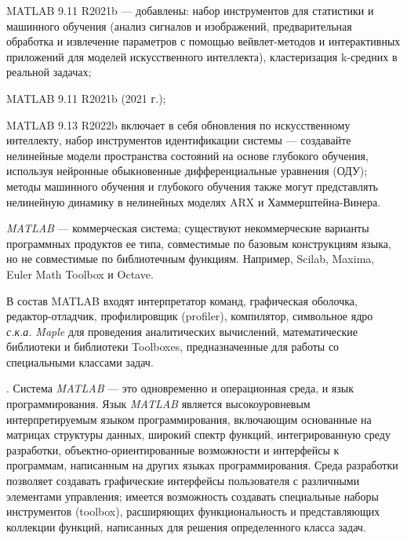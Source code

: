 \begin{textitemize}
	\item MATLAB 9.11 R2021b --- добавлены: набор инструментов для статистики и машинного обучения (анализ сигналов и изображений, предварительная обработка и извлечение параметров с помощью вейвлет-методов и интерактивных приложений для моделей искусственного интеллекта), кластеризация k-средних в реальной задачах; 
	\item MATLAB 9.11 R2021b (2021 г.);
	\item MATLAB 9.13 R2022b включает в себя обновления по искусственному интеллекту, набор инструментов идентификации системы --- создавайте нелинейные модели пространства состояний на основе глубокого обучения, используя нейронные обыкновенные дифференциальные уравнения (ОДУ); методы машинного обучения и глубокого обучения также могут представлять нелинейную динамику в нелинейных моделях ARX и Хаммерштейна-Винера.
\end{textitemize}

\textit{MATLAB} --- коммерческая система; существуют некоммерческие варианты программных продуктов ее типа, совместимые по базовым конструкциям языка, но не совместимые по библиотечным функциям. Например, Scilab, Maxima, Euler Math Toolbox и Octave.

В состав MATLAB входят интерпретатор команд, графическая оболочка, редактор-отладчик, профилировщик (profiler), компилятор, символьное ядро \textit{с.к.а.} \textit{Maple} для проведения аналитических вычислений, математические библиотеки и библиотеки Toolboxes, предназначенные для работы со специальными классами задач.

.
Система \textit{MATLAB} --- это одновременно и операционная среда, и язык программирования. Язык \textit{MATLAB} является высокоуровневым интерпретируемым языком программирования, включающим основанные на матрицах структуры данных, широкий спектр функций, интегрированную среду разработки, объектно-ориентированные возможности и интерфейсы к программам, написанным на других языках программирования. Среда разработки позволяет создавать графические интерфейсы пользователя с различными элементами управления; имеется возможность создавать специальные наборы инструментов (toolbox), расширяющих функциональность и представляющих коллекции функций, написанных для решения определенного класса задач.

